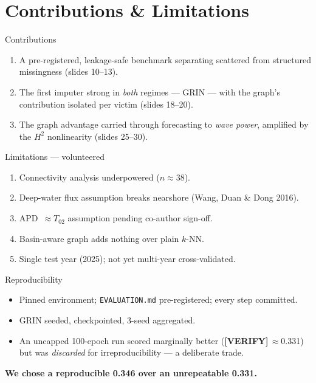 \documentclass[aspectratio=169]{beamer}
\newcommand{\take}[1]{\vspace{0.6ex}\begin{center}\textbf{\color{colgraph}#1}\end{center}}
\begin{document}
\section{Contributions \& Limitations}

\begin{frame}{Contributions}
  \begin{enumerate}
    \item A pre-registered, leakage-safe benchmark separating scattered from structured missingness (slides 10--13).
    \item The first imputer strong in \emph{both} regimes --- GRIN --- with the graph's contribution isolated per victim (slides 18--20).
    \item The graph advantage carried through forecasting to \emph{wave power}, amplified by the $H^2$ nonlinearity (slides 25--30).
  \end{enumerate}
\end{frame}

\begin{frame}{Limitations --- volunteered}
  \begin{enumerate}\small
    \item Connectivity analysis underpowered ($n\approx$38).
    \item Deep-water flux assumption breaks nearshore (Wang, Duan \& Dong 2016).
    \item APD~$\approx T_{02}$ assumption pending co-author sign-off.
    \item Basin-aware graph adds nothing over plain $k$-NN.
    \item Single test year (2025); not yet multi-year cross-validated.
  \end{enumerate}
\end{frame}

\begin{frame}{Reproducibility}
  \begin{itemize}\small
    \item Pinned environment; \texttt{EVALUATION.md} pre-registered; every step committed.
    \item GRIN seeded, checkpointed, 3-seed aggregated.
    \item An uncapped 100-epoch run scored marginally better (\textbf{[VERIFY]}\,$\approx$0.331) but was \emph{discarded} for irreproducibility --- a deliberate trade.
  \end{itemize}
  \take{We chose a reproducible 0.346 over an unrepeatable 0.331.}
\end{frame}
\end{document}
